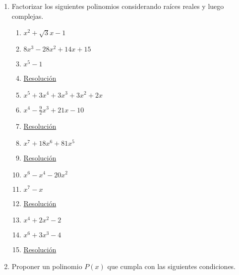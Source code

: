 \documentclass[a4paper]{article}
\newcommand{\answer}{\item[**]}
\newcommand{\exercise}{\item}
\newcommand{\df}[2]{\displaystyle\frac{#1}{#2}}
\begin{document}
\begin{enumerate}
\begin{multicols}{2}
\begin{enumerate} [label=(\alph*)]
		\item $3x^2+mx+4$ tiene a 1 como raíz
		\answer \href{https://youtu.be/09D5Z3dcaXc}{Resolución}

		\item $x^3+ax^2+bx+5$ es divisible por $Q(x)=x^2+x+1$
		\answer \href{https://youtu.be/jE5a43IQ91E}{Resolución}

	\end{enumerate}
	\end{multicols}

	\exercise Factorizar los siguientes polinomios considerando raíces reales y luego complejas.

	\begin{multicols}{2}
	\begin{enumerate} [label=(\alph*)]
		
		\item $x^2+\sqrt{3}x-1$
		\item $8x^3-28x^2+14x+15$

		\item $x^5-1$
		\answer \href{https://youtu.be/ZMBXAdxOleM}{Resolución}

		\item $x^5+3x^4+3x^3+3x^2+2x$
		
		\item $x^4-\df{9}{2}x^3+21x-10$
		\answer \href{https://youtu.be/1V06bnuaadA}{Resolución}

		\item $x^7+18x^6+81x^5$
		\answer \href{https://youtu.be/Z1KatpJM2eU}{Resolución}

		\item $x^6-x^4-20x^2$
		
		\item $x^7-x$
		\answer \href{https://youtu.be/EQIEmdkGOZE}{Resolución}

		\item $x^4+2x^2-2$

		\item $x^6+3x^3-4$
		\answer \href{https://youtu.be/BCo0pxE288w}{Resolución}

	\end{enumerate}
	\end{multicols}

	\exercise Proponer un polinomio $P(x)$ que cumpla con las siguientes condiciones.

	\begin{multicols}{2}
	\begin{enumerate} [label=(\alph*)]
		

\end{enumerate}
\end{multicols}
\end{enumerate}
\end{document}
